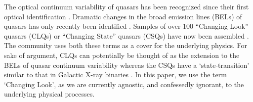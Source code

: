 \documentclass[fleqn,usenatbib]{mnras}
\begin{document}
The optical continuum variability of quasars has been recognized since
their first optical identification
\citep[e.g.,][]{MatthewsSandage1963, MacLeod2012}.  Dramatic changes
in the broad emission lines (BELs) of quasars has only recently been
identified \citep[e.g., ][]{LaMassa2015}.  Samples of over 100
``Changing Look'' quasars (CLQs) or ``Changing State'' quasars (CSQs)
have now been assembled \citep[e.g.][]{MacLeod2019, Graham2019b}. The
community uses both these terms as a cover for the underlying
physics. For sake of argument, CLQs can potentially be thought of as
the extension to the BELs of quasar continuum variability \citep[e.g.,
][]{MacLeod2012} whereas the CSQs have a `state-transition' similar to
that in Galactic X-ray binaries \citep[][]{NodaDone2018, Ruan2019a}. In
this paper, we use the term `Changing Look', as we are currently
agnostic, and confessedly ignorant, to the underlying physical
processes.
\end{document}
